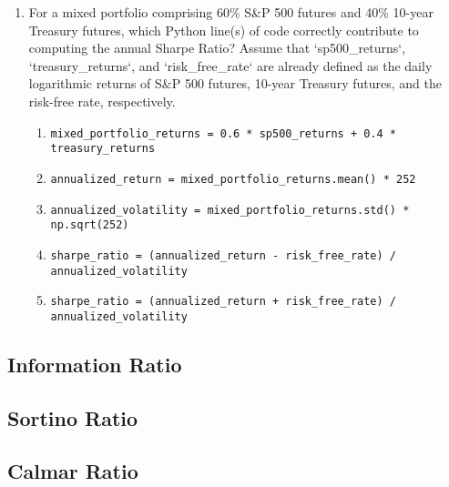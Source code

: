 \documentclass{article}
\begin{document}
\begin{enumerate}
    \item For a mixed portfolio comprising 60\% S\&P 500 futures and 40\% 10-year Treasury futures, which Python line(s) of code correctly contribute to computing the annual Sharpe Ratio? Assume that `sp500\_returns`, `treasury\_returns`, and `risk\_free\_rate` are already defined as the daily logarithmic returns of S\&P 500 futures, 10-year Treasury futures, and the risk-free rate, respectively.
    \begin{enumerate}
        \item \texttt{mixed\_portfolio\_returns = 0.6 * sp500\_returns + 0.4 * treasury\_returns}
        \item \texttt{annualized\_return = mixed\_portfolio\_returns.mean() * 252}
        \item \texttt{annualized\_volatility = mixed\_portfolio\_returns.std() * np.sqrt(252)}
        \item \texttt{sharpe\_ratio = (annualized\_return - risk\_free\_rate) / annualized\_volatility}
        \item \texttt{sharpe\_ratio = (annualized\_return + risk\_free\_rate) / annualized\_volatility}
    \end{enumerate}
    
\end{enumerate}

\subsection{Information Ratio}
\subsection{Sortino Ratio}
\subsection{Calmar Ratio}

\clearpage


\end{document}
